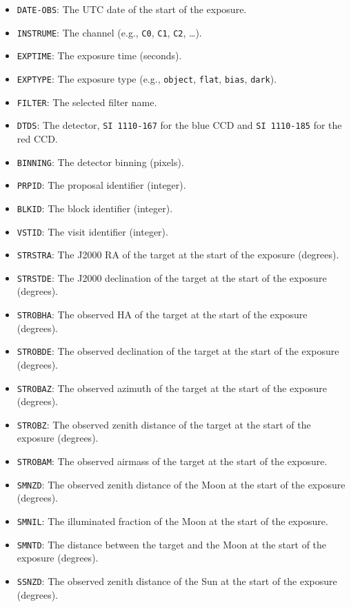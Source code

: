 \begin{itemize}
\item \verb|DATE-OBS|: The UTC date of the start of the exposure.
\item \verb|INSTRUME|: The channel (e.g., \verb|C0|, \verb|C1|, \verb|C2|, \ldots).
\item \verb|EXPTIME|: The exposure time (seconds).
\item \verb|EXPTYPE|: The exposure type (e.g., \verb|object|, \verb|flat|, \verb|bias|, \verb|dark|).
\item \verb|FILTER|: The selected filter name.
\item \verb|DTDS|: The detector, \verb|SI 1110-167| for the blue CCD and \verb|SI 1110-185| for the red CCD.
\item \verb|BINNING|: The detector binning (pixels).
\item \verb|PRPID|: The proposal identifier (integer).
\item \verb|BLKID|: The block identifier (integer).
\item \verb|VSTID|: The visit identifier (integer).
\item \verb|STRSTRA|: The J2000 RA of the target at the start of the exposure (degrees).
\item \verb|STRSTDE|: The J2000 declination of the target at the start of the exposure (degrees).
\item \verb|STROBHA|: The observed HA of the target at the start of the exposure (degrees).
\item \verb|STROBDE|: The observed declination of the target at the start of the exposure (degrees).
\item \verb|STROBAZ|: The observed azimuth of the target at the start of the exposure (degrees).
\item \verb|STROBZ|: The observed zenith distance of the target at the start of the exposure (degrees).
\item \verb|STROBAM|: The observed airmass of the target at the start of the exposure.
\item \verb|SMNZD|: The observed zenith distance of the Moon at the start of the exposure (degrees).
\item \verb|SMNIL|: The illuminated fraction of the Moon at the start of the exposure.
\item \verb|SMNTD|: The distance between the target and the Moon at the start of the exposure (degrees).
\item \verb|SSNZD|: The observed zenith distance of the Sun at the start of the exposure (degrees).
\end{itemize}


